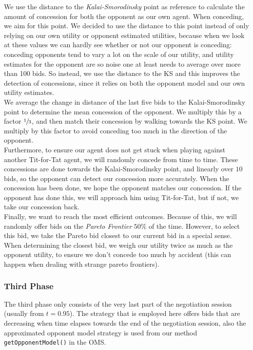 We use the distance to the \emph{Kalai-Smorodinsky} point as reference to calculate
the amount of concession for both the opponent as our own agent. When conceding, we aim for this point.
We decided to use the distance to this point instead of only relying on our own utility 
or opponent estimated utilities, because when we look at these values we can hardly see whether or not our opponent is conceding: conceding opponents tend to vary a lot on the scale of our utility,
and utility estimates for the opponent are so noise one at least needs to average over more than 100 bids. So instead, we use the distance to the KS and this improves the detection of concessions,
since it relies on both the opponent model and our own utility estimates. \\

We average the change in distance of the last five bids to the Kalai-Smorodinsky point to determine the mean concession of the opponent. We
multiply this by a factor $\sfrac{1}{3}$, and then match their concession by walking towards the KS point. We multiply by this factor to avoid conceding too much in the direction of the opponent. \\

Furthermore, to ensure our agent does not get stuck when playing against 
another Tit-for-Tat agent, we will randomly concede from time to time. 
These concessions are done towards the Kalai-Smorodinsky point, and linearly over 
$10$ bids, so the opponent can detect our concession more accurately. When the concession has been done, we hope the opponent matches  our concession. If the opponent has done this, we will approach him using Tit-for-Tat, but if not, we take our concession back. \\

Finally, we want to reach the most efficient outcomes. Because of this,
we will randomly offer bids on the \emph{Pareto Frontier} $50\%$ of the time.
However, to select this bid, we take the Pareto bid closest to our current bid in a special sense.
When determining the closest bid, we weigh our utility twice as much
as the opponent utility, to ensure we don't concede too much by accident 
(this can happen when dealing with strange pareto frontiers).

\subsubsection{Third Phase}

The third phase only consists of the very last part of the negotiation session (usually from $t=0.95$). The strategy that is employed here offers bids that are decreasing when time elapses towards the end of the negotiation session, also the approximated opponent model strategy is used from our method \texttt{getOpponentModel()} in the OMS. \\

